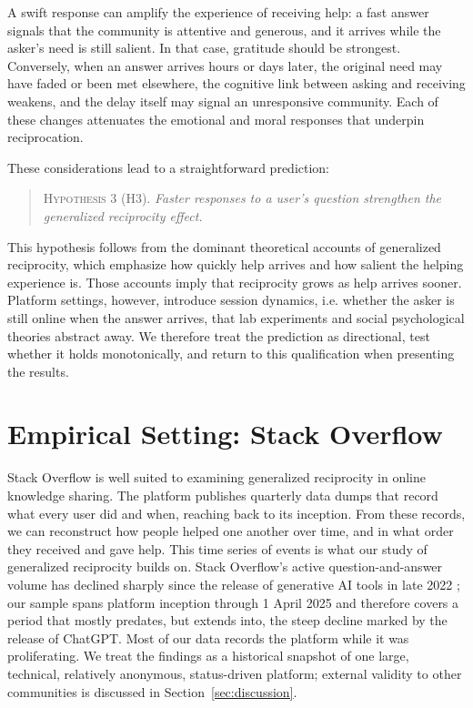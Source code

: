 A swift response can amplify the experience of receiving help: a fast answer signals that the community is attentive and generous, and it arrives while the asker's need is still salient. In that case, gratitude should be strongest. Conversely, when an answer arrives hours or days later, the original need may have faded or been met elsewhere, the cognitive link between asking and receiving weakens, and the delay itself may signal an unresponsive community. Each of these changes attenuates the emotional and moral responses that underpin reciprocation.

These considerations lead to a straightforward prediction:

\begin{quote}
\textsc{Hypothesis 3 (H3).} \emph{Faster responses to a user's question strengthen the generalized reciprocity effect.}
\end{quote}

This hypothesis follows from the dominant theoretical accounts of generalized reciprocity,
which emphasize how quickly help arrives and how salient the helping experience is. Those accounts imply that reciprocity grows as help arrives sooner. Platform settings, however, introduce session dynamics, i.e. whether the asker is still online when the answer arrives, that lab experiments and social psychological theories abstract away. We therefore treat the prediction as directional, test whether it holds monotonically, and return to this qualification when presenting the results.

\section{Empirical Setting: Stack Overflow}
\label{sec:empirical_setting}

Stack Overflow is well suited to examining generalized reciprocity in online knowledge sharing. The platform publishes quarterly data dumps that record what every user did and when, reaching back to its inception. From these records, we can reconstruct how people helped one another over time, and in what order they received and gave help. This time series of events is what our study of generalized reciprocity builds on. Stack Overflow's active question-and-answer volume has declined sharply since the release of generative AI tools in late 2022 \citep{delriochanona_large_2024, burtch_consequences_2024}; our sample spans platform inception through 1 April 2025 and therefore covers a period that mostly predates, but extends into, the steep decline marked by the release of ChatGPT. Most of our data records the platform while it was proliferating. We treat the findings as a historical snapshot of one large, technical, relatively anonymous, status-driven platform; external validity to other communities is discussed in Section~\ref{sec:discussion}.

